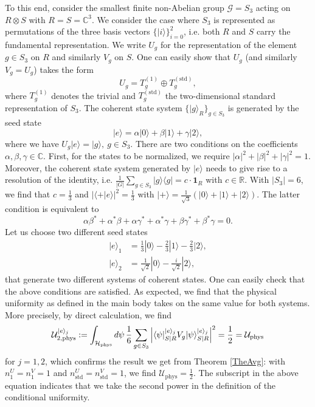 \documentclass[aps,10pt,twocolumn,showpacs,pra,citeautoscript,amsmath,amssymb,floatfix,superscriptaddress]{revtex4-1}
\def\phys{{\mathrm{phys}}}
\begin{document}
To this end, consider the smallest finite non-Abelian group $\mathcal{G}=S_3$ acting on $R\otimes S$ with $R=S = \mathbb{C}^3$. We consider the case where $S_3$ is represented as permutations of the three basis vectors $\{ |i\rangle \}_{i=0}^2$, i.e. both $R$ and $S$ carry the fundamental representation. We write $U_g$ for the representation of the element $g\in S_3$ on $R$ and similarly $V_g$ on $S$. One can easily show that $U_g$ (and similarly $V_g=U_g$) takes the form 
\[
   U_g = T_g^{(1)} \oplus T_g^{(\mathrm{std})},
\]
where $T_g^{(1)}$ denotes the trivial and $T_g^{(\mathrm{std})}$ the two-dimensional standard representation of $S_3$.
The coherent state system $\{ |g\rangle_R \}_{g\in S_3}$ is generated by the seed state 
\[
   |e\rangle = \alpha |0\rangle + \beta |1\rangle + \gamma |2\rangle,
\]
where we have $U_g|e\rangle = |g\rangle,\ g\in S_3$.
There are two conditions on the coefficients $\alpha, \beta, \gamma \in \mathbb{C}$. First, for the states to be normalized, we require $|\alpha|^2 + |\beta|^2 +|\gamma|^2 = 1$. Moreover, the coherent state system generated by $|e\rangle$ needs to give rise to a resolution of the identity, i.e. $\frac{1}{|G|}\sum_{g \in S_3} |g\rangle\langle g | =c\cdot\mathbf{1}_R$ with $c\in\mathbb{R}$. With $|S_3|=6$, we find that $c=\frac{1}{3}$ and $| \langle + | e \rangle |^2 = \frac{1}{3}$ with $|+\rangle = \frac{1}{\sqrt{3}} ( |0\rangle +  |1\rangle +  |2\rangle )$. The latter condition is equivalent to 
\[
    \alpha \beta^* + \alpha^*\beta + \alpha \gamma^* + \alpha^*\gamma + \beta \gamma^* + \beta^* \gamma = 0.
\]
Let us choose two different seed states 
\begin{align*}
    |e\rangle_1 &= \frac{1}{3} |0\rangle - \frac{2}{3} |1\rangle - \frac{2}{3} |2\rangle, \\
    |e\rangle_2 &= \frac{1}{\sqrt{2}} |0\rangle  - \frac{i}{\sqrt{2}} |2\rangle,
\end{align*}
that generate two different systems of coherent states. One can easily check that the above conditions are satisfied. As expected, we find that the physical uniformity as defined in the main body takes on the same value for both systems. More precisely, by direct calculation, we find
\[
    \mathcal{U}_{2,{\rm phys}}^{|e\rangle_j}:= \int_{\mathcal{H}_{\rm phys}} d\psi\,  \frac{1}{6} \sum_{g\in S_3} \left|\langle\psi|_{S|R}^{|e\rangle_j} V_g |\psi\rangle_{S|R}^{|e\rangle_j} \right|^2 = \frac{1}{2} = \mathcal{U}_{\rm phys}
\]
for $j=1,2$, which confirms the result we get from Theorem \ref{TheAvg}: with $n^U_1 = n_1^V = 1$ and $n^U_{\mathrm{std}} = n_{\mathrm{std}}^V = 1$, we find $\mathcal{U}_{\phys}=\frac{1}{2}$. The subscript in the above equation indicates that we take the second power in the definition of the conditional uniformity. 
\end{document}
